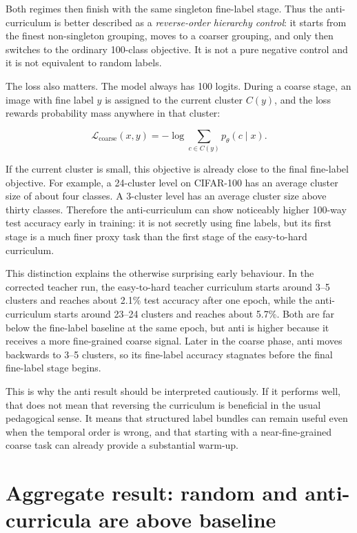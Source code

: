 Both regimes then finish with the same singleton fine-label stage. Thus the
anti-curriculum is better described as a \emph{reverse-order hierarchy control}:
it starts from the finest non-singleton grouping, moves to a coarser grouping,
and only then switches to the ordinary 100-class objective. It is not a pure
negative control and it is not equivalent to random labels.

The loss also matters. The model always has 100 logits. During a coarse stage,
an image with fine label $y$ is assigned to the current cluster $C(y)$, and the
loss rewards probability mass anywhere in that cluster:

\[
    \mathcal{L}_{\mathrm{coarse}}(x,y)
    = -\log \sum_{c \in C(y)} p_\theta(c \mid x).
\]

If the current cluster is small, this objective is already close to the final
fine-label objective. For example, a 24-cluster level on CIFAR-100 has an average
cluster size of about four classes. A 3-cluster level has an average cluster
size above thirty classes. Therefore the anti-curriculum can show noticeably
higher 100-way test accuracy early in training: it is not secretly using fine
labels, but its first stage is a much finer proxy task than the first stage of
the easy-to-hard curriculum.

This distinction explains the otherwise surprising early behaviour. In the
corrected teacher run, the easy-to-hard teacher curriculum starts around 3--5
clusters and reaches about 2.1\% test accuracy after one epoch, while the
anti-curriculum starts around 23--24 clusters and reaches about 5.7\%. Both are
far below the fine-label baseline at the same epoch, but anti is higher because
it receives a more fine-grained coarse signal. Later in the coarse phase, anti
moves backwards to 3--5 clusters, so its fine-label accuracy stagnates before the
final fine-label stage begins.

This is why the anti result should be interpreted cautiously. If it performs
well, that does not mean that reversing the curriculum is beneficial in the
usual pedagogical sense. It means that structured label bundles can remain
useful even when the temporal order is wrong, and that starting with a
near-fine-grained coarse task can already provide a substantial warm-up.

\section{Aggregate result: random and anti-curricula are above baseline}

